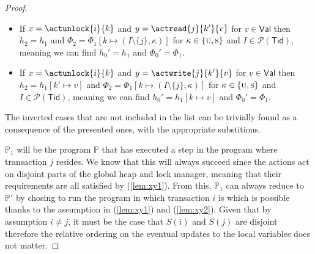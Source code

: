 \begin{proof}
\begin{itemize}
	\item If $x = \actunlock{i}{k}$ and $y = \actread{j}{k'}{v}$ for $v \in \mathsf{Val}$ then $h_2 = h_1$ and $\Phi_2 = \Phi_1[k \mapsto (I \setminus \{j\}, \kappa)]$ for $\kappa \in \{\textsc{u}, \textsc{s}\}$ and $I \in \mathcal{P}(\mathsf{Tid})$, meaning we can find $h_0' = h_1$ and $\Phi_0' = \Phi_1$.
	
	\item If $x = \actunlock{i}{k}$ and $y = \actwrite{j}{k'}{v}$ for $v \in \mathsf{Val}$ then $h_2 = h_1[k' \mapsto v]$ and $\Phi_2 = \Phi_1[k \mapsto (I \setminus \{j\}, \kappa)]$ for $\kappa \in \{\textsc{u}, \textsc{s}\}$ and $I \in \mathcal{P}(\mathsf{Tid})$, meaning we can find $h_0' = h_1[k \mapsto v]$ and $\Phi_0' = \Phi_1$.
\end{itemize}
The inverted cases that are not included in the list can be trivially found as a consequence of the presented ones, with the appropriate substitions.

$\mathds{P}_1$ will be the program $\mathds{P}$ that has executed a step in the program where transaction $j$ resides. We know that this will always succeed since the actions act on disjoint parts of the global heap and lock manager, meaning that their requirements are all satisfied by (\ref{lem:xy1}). From this, $\mathds{P}_1$ can always reduce to $\mathds{P}'$ by chosing to run the program in which transaction $i$ is which is possible thanks to the assumption in (\ref{lem:xy1}) and (\ref{lem:xy2}). Given that by assumption $i \neq j$, it must be the case that $S(i)$ and $S(j)$ are disjoint therefore the relative ordering on the eventual updates to the local variables does not matter.
\end{proof}

